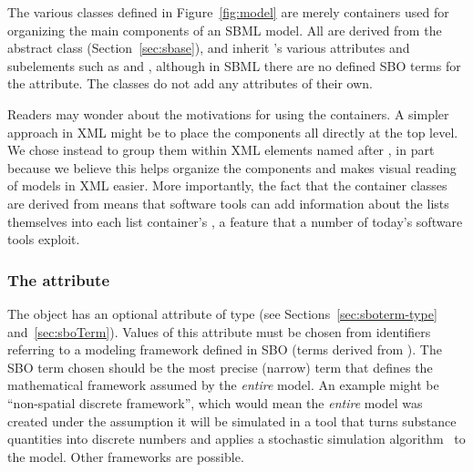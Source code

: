 The various \ListOf classes defined in Figure~\ref{fig:model} are
merely containers used for organizing the main components of an
SBML model.  All are derived from the abstract class \SBase
(Section~\ref{sec:sbase}), and inherit \SBase's various attributes
and subelements such as  and ,
although in SBML \thisLVR there are no defined SBO terms for the
 attribute.  The \ListOf classes do not add any
attributes of their own.

Readers may wonder about the motivations for using the \ListOf
containers.  A simpler approach in XML might be to place the
components all directly at the top level.  We chose instead to
group them within XML elements named after
, in part because we believe this helps
organize the components and makes visual reading of
models in XML easier.  More importantly, the fact that
the container classes are derived from \SBase means that software
tools can add information about the lists themselves into each
list container's , a feature that a number of
today's software tools exploit.


\subsubsection{The  attribute}
\label{sec:model-sboterm}

The \Model object has an optional 
attribute of type  (see
Sections~\ref{sec:sboterm-type} and~\ref{sec:sboTerm}).
Values of this attribute must be chosen from
  identifiers referring to a modeling framework defined in SBO
(\ie terms derived from \sboframework).  The SBO term chosen
should be the most precise (narrow) term that defines the
mathematical framework assumed by the \emph{entire} model.  An
example might be ``non-spatial discrete framework'', which would
mean the \emph{entire} model was created under the assumption it
will be simulated in a tool that turns substance quantities into
discrete numbers and applies a stochastic simulation
algorithm~\citep[e.g.,][]{gillespie:1977} to the model.  Other
frameworks are possible.

